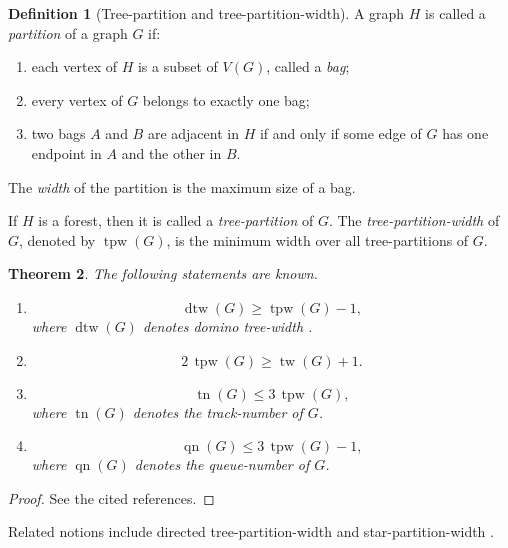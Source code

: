 \documentclass[10pt]{book}
\newtheorem{theorem}{Theorem}[section]
\theoremstyle{definition}
\newtheorem{definition}[theorem]{Definition}
\begin{document}
\begin{definition}[Tree-partition and tree-partition-width]
\cite{58}
A graph \(H\) is called a \emph{partition} of a graph \(G\) if:
\begin{enumerate}
    \item each vertex of \(H\) is a subset of \(V(G)\), called a \emph{bag};
    \item every vertex of \(G\) belongs to exactly one bag;
    \item two bags \(A\) and \(B\) are adjacent in \(H\) if and only if some edge of \(G\) has one endpoint in \(A\) and the other in \(B\).
\end{enumerate}
The \emph{width} of the partition is the maximum size of a bag.

If \(H\) is a forest, then it is called a \emph{tree-partition} of \(G\).  
The \emph{tree-partition-width} of \(G\), denoted by \(\operatorname{tpw}(G)\), is the minimum width over all tree-partitions of \(G\).
\end{definition}

\begin{theorem}
The following statements are known.
\begin{enumerate}
    \item
    \[
    \operatorname{dtw}(G)\geq \operatorname{tpw}(G)-1,
    \]
    where \(\operatorname{dtw}(G)\) denotes domino tree-width \cite{58}.

    \item
    \[
    2\,\operatorname{tpw}(G)\geq \operatorname{tw}(G)+1.
    \]
    \cite{58}

    \item
    \[
    \operatorname{tn}(G)\leq 3\,\operatorname{tpw}(G),
    \]
    where \(\operatorname{tn}(G)\) denotes the track-number of \(G\). \cite{dujmovic2005layout}

    \item
    \[
    \operatorname{qn}(G)\leq 3\,\operatorname{tpw}(G)-1,
    \]
    where \(\operatorname{qn}(G)\) denotes the queue-number of \(G\). \cite{dujmovic2005layout}
\end{enumerate}
\end{theorem}

\begin{proof}
See the cited references.
\end{proof}

Related notions include directed tree-partition-width \cite{191} and star-partition-width \cite{Wood2022ProductSO}.
\end{document}
